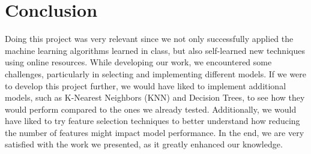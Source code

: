 \section{Conclusion}
Doing this project was very relevant since we not only successfully applied the machine learning algorithms learned in class, but also self-learned new techniques using online resources. While developing our work, we encountered some challenges, particularly in selecting and implementing different models. If we were to develop this project further, we would have liked to implement additional models, such as K-Nearest Neighbors (KNN) and Decision Trees, to see how they would perform compared to the ones we already tested. Additionally, we would have liked to try feature selection techniques to better understand how reducing the number of features might impact model performance. In the end, we are very satisfied with the work we presented, as it greatly enhanced our knowledge.